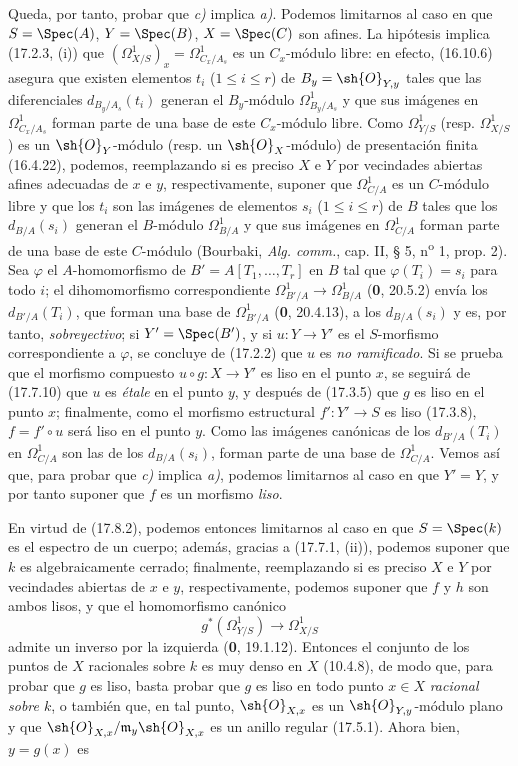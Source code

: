 
Queda, por tanto, probar que \emph{c)} implica \emph{a)}. Podemos limitarnos al caso en que $S=\Spec(A)$, $Y=\Spec(B)$, $X=\Spec(C)$ son afines. La hipótesis implica (17.2.3, (i)) que $(\varOmega^1_{X/S})_x=\Omega^1_{C_x/A_s}$ es un $C_x$-módulo libre: en efecto, (16.10.6) asegura que existen elementos $t_i$ ($1\leq i\leq r$) de $B_y=\sh{O}_{Y,y}$ tales que las diferenciales $d_{B_y/A_s}(t_i)$ generan el $B_y$-módulo $\Omega^1_{B_y/A_s}$ y que sus imágenes en $\Omega^1_{C_x/A_s}$ forman parte de una base de este $C_x$-módulo libre. Como $\varOmega^1_{Y/S}$ (resp. $\varOmega^1_{X/S}$) es un $\sh{O}_Y$-módulo (resp. un $\sh{O}_X$-módulo) de presentación finita (16.4.22), podemos, reemplazando si es preciso $X$ e $Y$ por vecindades abiertas afines adecuadas de $x$ e $y$, respectivamente, suponer que $\Omega^1_{C/A}$ es un $C$-módulo libre y que los $t_i$ son las imágenes de elementos $s_i$ ($1\leq i\leq r$) de $B$ tales que los $d_{B/A}(s_i)$ generan el $B$-módulo $\Omega^1_{B/A}$ y que sus imágenes en $\Omega^1_{C/A}$ forman parte de una base de este $C$-módulo (Bourbaki, \emph{Alg. comm.}, cap. II, § 5, n\textsuperscript{o} 1, prop. 2). Sea $\varphi$ el $A$-homomorfismo de $B'=A[T_1,\ldots,T_r]$ en $B$ tal que $\varphi(T_i)=s_i$ para todo $i$; el dihomomorfismo correspondiente $\Omega^1_{B'/A}\to\Omega^1_{B/A}$ (\textbf 0, 20.5.2) envía los $d_{B'/A}(T_i)$, que forman una base de $\Omega^1_{B'/A}$ (\textbf 0, 20.4.13), a los $d_{B/A}(s_i)$ y es, por tanto, \emph{sobreyectivo}; si $Y'=\Spec(B')$, y si $u:Y\to Y'$ es el $S$-morfismo correspondiente a $\varphi$, se concluye de (17.2.2) que $u$ es \emph{no ramificado}. Si se prueba que el morfismo compuesto $u\circ g:X\to Y'$ es liso en el punto $x$, se seguirá de (17.7.10) que $u$ es \emph{étale} en el punto $y$, y después de (17.3.5) que $g$ es liso en el punto $x$; finalmente, como el morfismo estructural $f':Y'\to S$ es liso (17.3.8), $f=f'\circ u$ será liso en el punto $y$. Como las imágenes canónicas de los $d_{B'/A}(T_i)$ en $\Omega^1_{C/A}$ son las de los $d_{B/A}(s_i)$, forman parte de una base de $\Omega^1_{C/A}$. Vemos así que, para probar que \emph{c)} implica \emph{a)}, podemos limitarnos al caso en que $Y'=Y$, y por tanto suponer que $f$ es un morfismo \emph{liso}.

En virtud de (17.8.2), podemos entonces limitarnos al caso en que $S=\Spec(k)$ es el espectro de un cuerpo; además, gracias a (17.7.1, (ii)), podemos suponer que $k$ es algebraicamente cerrado; finalmente, reemplazando si es preciso $X$ e $Y$ por vecindades abiertas de $x$ e $y$, respectivamente, podemos suponer que $f$ y $h$ son ambos lisos, y que el homomorfismo canónico
\[
g^*(\varOmega^1_{Y/S})\to\varOmega^1_{X/S}
\]
admite un inverso por la izquierda (\textbf 0, 19.1.12). Entonces el conjunto de los puntos de $X$ racionales sobre $k$ es muy denso en $X$ (10.4.8), de modo que, para probar que $g$ es liso, basta probar que $g$ es liso en todo punto $x\in X$ \emph{racional sobre $k$}, o también que, en tal punto, $\sh{O}_{X,x}$ es un $\sh{O}_{Y,y}$-módulo plano y que $\sh{O}_{X,x}/\mathfrak m_y\sh{O}_{X,x}$ es un anillo regular (17.5.1). Ahora bien, $y=g(x)$ es

